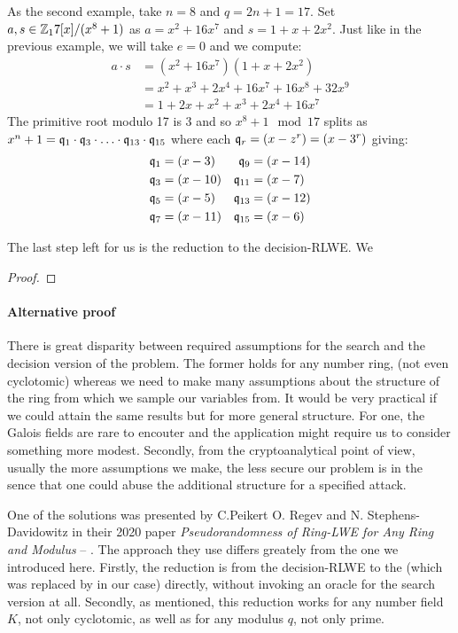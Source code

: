\begin{example}
	As the second example, take $n = 8$ and $q = 2n+1 = 17$. Set $a,s \in \mathbb{Z}_17[x]/(x^8+1)$ as $a = x^2 + 16x^7$ and $s = 1 + x + 2x^2$. Just like in the previous example, we will take $e=0$ and we compute:
	\begin{align*}
		a\cdot s & = (x^2+16x^7)(1+x+2x^2) \\
				 & = x^2 + x^3 + 2x^4 + 16x^7 + 16x^8 +32x^9 \\
				 & = 1 + 2x +x^2 +x^3+2x^4+16x^7
	\end{align*}
	The primitive root modulo 17 is 3 and so $x^8+1 \mod 17$ splits as $x^n+1 = \mathfrak{q}_1 \cdot \mathfrak{q}_3 \cdot \ldots \cdot \mathfrak{q}_{13} \cdot \mathfrak{q}_{15}$ where each $\mathfrak{q}_r = (x-z^r) = (x-3^r)$ giving:
	\begin{align*}
		& \mathfrak{q}_1 = (x-3) & \mathfrak{q}_9 & = (x-14) \\
		& \mathfrak{q}_3 = (x-10) & \mathfrak{q}_{11} & = (x-7) \\
		& \mathfrak{q}_5 = (x-5) & \mathfrak{q}_{13} & = (x-12) \\
		& \mathfrak{q}_7 = (x-11) & \mathfrak{q}_{15} & = (x-6)
	\end{align*}

\end{example}

The last step left for us is the reduction to the decision-RLWE. We 
\begin{lemma}
\end{lemma}
\begin{proof}
\end{proof}

\paragraph{Alternative proof}
There is great disparity between required assumptions for the search and the decision version of the problem. The former holds for any number ring, (not even cyclotomic) whereas we need to make many assumptions about the structure of the ring from which we sample our variables from. It would be very practical if we could attain the same results but for more general structure. For one, the Galois fields are rare to encouter and the application might require us to consider something more modest. Secondly, from the cryptoanalytical point of view, usually the more assumptions we make, the less secure our problem is in the sence that one could abuse the additional structure for a specified attack.

One of the solutions was presented by C.Peikert O. Regev and N. Stephens-Davidowitz in their 2020 paper \textit{Pseudorandomness of Ring-LWE for Any Ring and Modulus} -- \cite{oracle}. The approach they use differs greately from the one we introduced here. Firstly, the reduction is from the decision-RLWE to the  (which was replaced by  in our case) directly, without invoking an oracle for the search version at all. Secondly, as mentioned, this reduction works for any number field $K$, not only cyclotomic, as well as for any modulus $q$, not only prime.

